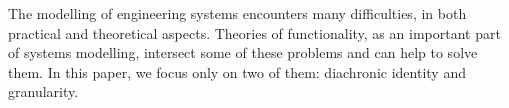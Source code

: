 \documentclass[
]{ceurart}
\begin{document}
The modelling of engineering systems encounters many difficulties, in both practical and theoretical aspects. 
Theories of functionality, as an important part of systems modelling, intersect some of these problems and can help to solve them. In this paper, we focus only on two of them: diachronic identity and granularity.
\end{document}
